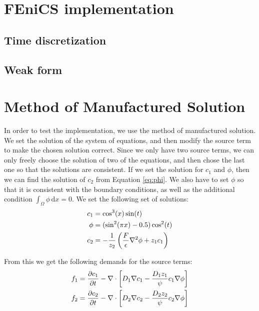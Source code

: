 \documentclass[12pt]{article}
\begin{document}
\section{FEniCS implementation}

\subsection{Time discretization}

\subsection{Weak form}

\section{Method of Manufactured Solution}
In order to test the implementation, we use the method of manufactured solution. We set the solution of the system of equations, and then modify the source term to make the chosen solution correct. Since we only have two source terms, we can only freely choose the solution of two of the equations, and then chose the last one so that the solutions are consistent. If we set the solution for $c_1$ and $\phi$, then we can find the solution of $c_2$ from Equation \eqref{eq:phi}. We also have to set $\phi$ so that it is consistent with the boundary conditions, as well as the additional condition $\int_\Omega \phi\, \text{d}x = 0$. We set the following set of solutions:
\begin{align}
c_1 &= \cos^3(x) \sin(t) \\ 
\phi &= (\sin^2(\pi x) - 0.5)\cos^2(t) \\
c_2 & = -{1\over z_2} \left( {F \over \epsilon}\nabla^2\phi + z_1c_1\right)
\end{align}

From this we get the following demands for the source terms: 
\begin{align}
f_1 & = {\partial c_1 \over \partial t} - \nabla \cdot\left[ D_1 \nabla c_1 - {D_1z_1 \over \psi} c_1 \nabla \phi \right] \\ 
f_2 & = {\partial c_2 \over \partial t} - \nabla \cdot\left[ D_2 \nabla c_2 - {D_2z_2 \over \psi} c_2 \nabla \phi \right]
\end{align}
\end{document}
